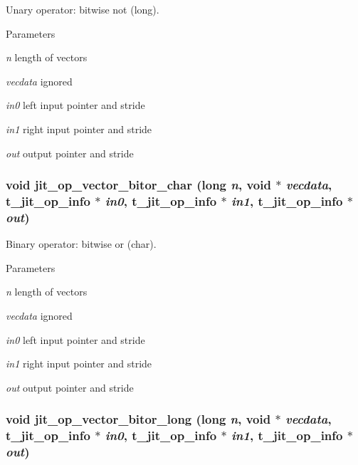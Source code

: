 Unary operator: bitwise not (long). 
\begin{DoxyParams}{Parameters}
\item[{\em n}]length of vectors \item[{\em vecdata}]ignored \item[{\em in0}]left input pointer and stride \item[{\em in1}]right input pointer and stride \item[{\em out}]output pointer and stride \end{DoxyParams}
\hypertarget{group__opvecmod_ga83500ff0d582205c900648a0cf2de281}{
\subsubsection[{jit\_\-op\_\-vector\_\-bitor\_\-char}]{\setlength{\rightskip}{0pt plus 5cm}void jit\_\-op\_\-vector\_\-bitor\_\-char (long {\em n}, \/  void $\ast$ {\em vecdata}, \/  {\bf t\_\-jit\_\-op\_\-info} $\ast$ {\em in0}, \/  {\bf t\_\-jit\_\-op\_\-info} $\ast$ {\em in1}, \/  {\bf t\_\-jit\_\-op\_\-info} $\ast$ {\em out})}}
\label{group__opvecmod_ga83500ff0d582205c900648a0cf2de281}


Binary operator: bitwise or (char). 
\begin{DoxyParams}{Parameters}
\item[{\em n}]length of vectors \item[{\em vecdata}]ignored \item[{\em in0}]left input pointer and stride \item[{\em in1}]right input pointer and stride \item[{\em out}]output pointer and stride \end{DoxyParams}
\hypertarget{group__opvecmod_ga4124b406dd10e8428d450afa27110c3d}{
\subsubsection[{jit\_\-op\_\-vector\_\-bitor\_\-long}]{\setlength{\rightskip}{0pt plus 5cm}void jit\_\-op\_\-vector\_\-bitor\_\-long (long {\em n}, \/  void $\ast$ {\em vecdata}, \/  {\bf t\_\-jit\_\-op\_\-info} $\ast$ {\em in0}, \/  {\bf t\_\-jit\_\-op\_\-info} $\ast$ {\em in1}, \/  {\bf t\_\-jit\_\-op\_\-info} $\ast$ {\em out})}}
\label{group__opvecmod_ga4124b406dd10e8428d450afa27110c3d}


